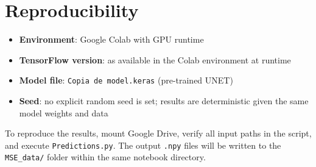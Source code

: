 \documentclass[11pt,a4paper]{article}
\begin{document}
\section{Reproducibility}

\begin{itemize}
    \item \textbf{Environment}: Google Colab with GPU runtime
    \item \textbf{TensorFlow version}: as available in the Colab environment at runtime
    \item \textbf{Model file}: \texttt{Copia de model.keras} (pre-trained UNET)
    \item \textbf{Seed}: no explicit random seed is set; results are deterministic given the same model weights and data
\end{itemize}

To reproduce the results, mount Google Drive, verify all input paths in the script, and execute \texttt{Predictions.py}. The output \texttt{.npy} files will be written to the \texttt{MSE\_data/} folder within the same notebook directory.
\end{document}
